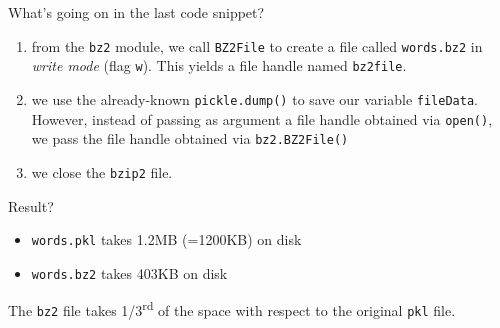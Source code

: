 \documentclass[t,handout,9pt]{beamer}
\begin{document}
%
\begin{frame}
\vfill
What's going on in the last code snippet?
\begin{enumerate}
	\item from the \texttt{bz2} module, we call \texttt{BZ2File} to create a file called \texttt{words.bz2} in \textit{write mode} (flag \texttt{w}). This yields a file handle named \texttt{bz2file}.
	\item we use the already-known \texttt{pickle.dump()} to save our variable \texttt{fileData}. However, instead of passing as argument a file handle obtained via \texttt{open()}, we pass the file handle obtained via \texttt{bz2.BZ2File()}
	\item we close the \texttt{bzip2} file.
\end{enumerate}
\vfill
Result?
\begin{itemize}
	\item \texttt{words.pkl} takes 1.2MB (=1200KB) on disk
	\item \texttt{words.bz2} takes 403KB on disk
\end{itemize}
The \texttt{bz2} file takes 1/3\textsuperscript{rd} of the space with respect to the original \texttt{pkl} file.
\vfill
\end{frame}
%
\end{document}
